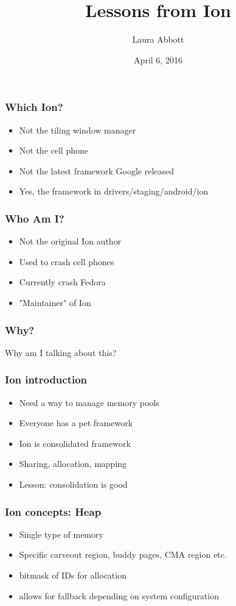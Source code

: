 \documentclass{beamer}
\title[Lessons from Ion]{Lessons from Ion}
\author{Laura Abbott}
\institute[Red Hat]
{
\textit{labbott@redhat.com}
\\
\textit{labbott@fedoraproject.org}
\\
\textit{laura@labbott.name}
}
\date{April 6, 2016}
\begin{document}
\begin{frame}
\titlepage
\end{frame}


\begin{frame}
\frametitle{Which Ion?}
\begin{itemize}
\item Not the tiling window manager
\item Not the cell phone
\item Not the latest framework Google released
\item Yes, the framework in drivers/staging/android/ion
\end{itemize}
\end{frame}

\begin{frame}
\frametitle{Who Am I?}
\begin{itemize}
\item Not the original Ion author
\item Used to crash cell phones
\item Currently crash Fedora
\item "Maintainer" of Ion
\end{itemize}
\end{frame}

\begin{frame}
\frametitle{Why?}
\Huge{\centerline{Why am I talking about this?}}
\end{frame}

\begin{frame}
\frametitle{Ion introduction}
\begin{itemize}
\item Need a way to manage memory pools
\item Everyone has a pet framework
\item Ion is consolidated framework
\item Sharing, allocation, mapping
\item Lesson: consolidation is good
\end{itemize}
\end{frame}

\begin{frame}
\frametitle{Ion concepts: Heap}
\begin{itemize}
\item Single type of memory
\item Specific carveout region, buddy pages, CMA region etc.
\item bitmask of IDs for allocation
\item allows for fallback depending on system configuration
\end{itemize}
\end{frame}
\end{document}
